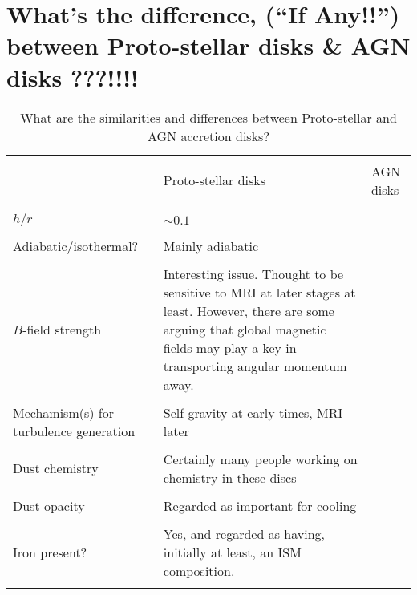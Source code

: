 \documentclass[11pt,a4paper]{article}
\begin{document}
\section{What's the difference, (``If Any!!'') between Proto-stellar disks \& AGN disks ???!!!!}
\begin{landscape}
\begin{table}[]
  \centering
  \caption{What are the similarities and differences between 
    Proto-stellar and AGN accretion disks?
}
  \label{my-label}
  \begin{tabular}{  p{65mm}   p{70mm}  p{70mm} }
    \hline
    \hline
 &  &  \\
                              & Proto-stellar disks & AGN disks \\
 &  &  \\
        \hline
 &  &  \\
    $h/r$                              & $\sim0.1$    &   \\
 &  &  \\
    Adiabatic/isothermal?      &  Mainly adiabatic &  \\
 &  &  \\
    $B$-field strength             &  Interesting issue.  Thought to be sensitive to MRI at later stages at least.  
                                               However, there are some arguing that global magnetic fields may play a key in transporting angular momentum away.  &  \\
 &  &  \\
      Mechamism(s) for  turbulence generation           &  Self-gravity at early times,  MRI later &    \\
           &  &  \\
Dust chemistry                       &  Certainly many people working on chemistry in these discs
&  \\
 &  &  \\
Dust opacity                        &  Regarded as important for cooling&  \\
 &  &  \\
Iron present?                        & Yes, and regarded as having, initially at least, an ISM composition. &  \\
 &  &  \\
    \hline
    \hline
\end{tabular}
\end{table}
\end{landscape}
\end{document}
